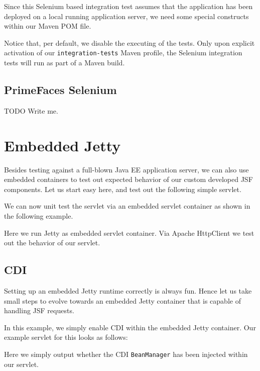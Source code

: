 Since this Selenium based integration test assumes that the application has been deployed on a local running application server, we need some special constructs within our Maven POM file.

Notice that, per default, we disable the executing of the tests.
Only upon explicit activation of our \texttt{integration-tests} Maven profile,
the Selenium integration tests will run as part of a Maven build.

\subsection{PrimeFaces Selenium}
\begin{TODO}{TODO}
	Write me.
\end{TODO}

\section{Embedded Jetty}
Besides testing against a full-blown Java EE application server, we can also use embedded containers to test out expected behavior of our custom developed JSF components.
Let us start easy here, and test out the following simple servlet.


We can now unit test the servlet via an embedded servlet container as shown in the following example.

Here we run Jetty \cite{jetty} as embedded servlet container.
Via Apache HttpClient \cite{httpclient} we test out the behavior of our servlet.

\subsection{CDI}
Setting up an embedded Jetty runtime correctly is always fun.
Hence let us take small steps to evolve towards an embedded Jetty container that is capable of handling JSF requests.

In this example, we simply enable CDI within the embedded Jetty container.
Our example servlet for this looks as follows:

Here we simply output whether the CDI \texttt{BeanManager} has been injected within our servlet.

